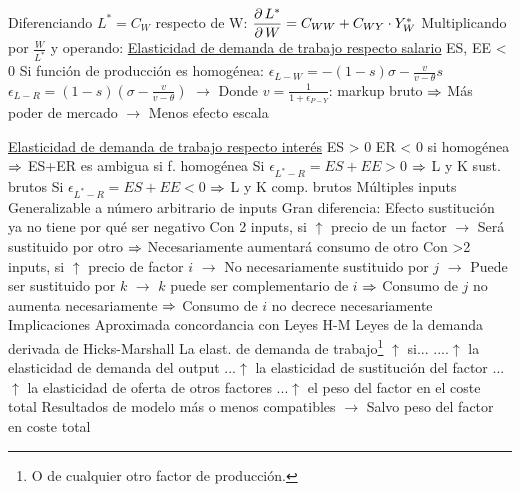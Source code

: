 \documentclass{nuevotema}
\begin{document}
\begin{esquemal}
				\4[] Diferenciando $L^* = C_W$ respecto de W:
				\4[] $\dfrac{\partial \, L^*}{\partial \, W} = C_{WW} + C_{WY}\cdot Y^*_W$
				\4[] Multiplicando por $\frac{W}{L^*}$ y operando:
				\4[] \underline{Elasticidad de demanda de trabajo respecto salario}
				\4[] 
				\4[] ES, EE < 0
				\4[] Si función de producción es homogénea:
				\4[] $\epsilon_{L-W} = - (1-s)\sigma - \frac{v}{v-\theta}s $
				\4[] $\epsilon_{L-R} = (1-s)\left( \sigma - \frac{v}{v-\theta} \right)$
				\4[] $\to$ Donde $v = \frac{1}{1+\epsilon_{P-Y}}$: markup bruto
				\4[] $\Rightarrow$ Más poder de mercado $\to$ Menos efecto escala

				\4[] \underline{Elasticidad de demanda de trabajo respecto interés}
				\4[] 
				\4[] ES > 0
				\4[] ER < 0 si homogénea
				\4[] $\Rightarrow$ ES+ER es ambigua si f. homogénea
				\4[] Si $\epsilon_{L^*-R} = ES+EE > 0$ $\Rightarrow$ L y K sust. brutos
				\4[] Si $\epsilon_{L^*-R} = ES+EE < 0$ $\Rightarrow$ L y K comp. brutos
			\3 Múltiples inputs
				\4 Generalizable a número arbitrario de inputs
				\4 Gran diferencia:
				\4[] Efecto sustitución ya no tiene por qué ser negativo
				\4[] Con 2 inputs, si $\uparrow$ precio de un factor
				\4[] $\to$ Será sustituido por otro
				\4[] $\Rightarrow$ Necesariamente aumentará consumo de otro
				\4[] Con >2 inputs, si $\uparrow$ precio de factor $i$
				\4[] $\to$ No necesariamente sustituido por $j$
				\4[] $\to$ Puede ser sustituido por $k$
				\4[] $\to$ $k$ puede ser complementario de $i$
				\4[] $\Rightarrow$ Consumo de $j$ no aumenta necesariamente
				\4[] $\Rightarrow$ Consumo de $i$ no decrece necesariamente
			\3 Implicaciones
				\4 Aproximada concordancia con Leyes H-M
				\4[] Leyes de la demanda derivada de Hicks-Marshall
				\4[] La elast. de demanda de trabajo\footnote{O de cualquier otro factor de producción.} $\uparrow$ si...
				\4[1] ....$\uparrow$ la elasticidad de demanda del output
				\4[2] ...$\uparrow$ la elasticidad de sustitución del factor
				\4[3] ...$\uparrow$ la elasticidad de oferta de otros factores
				\4[4] ...$\uparrow$ el peso del factor en el coste total
				\4[] Resultados de modelo más o menos compatibles
				\4[] $\to$ Salvo peso del factor en coste total

\end{esquemal}
\end{document}
